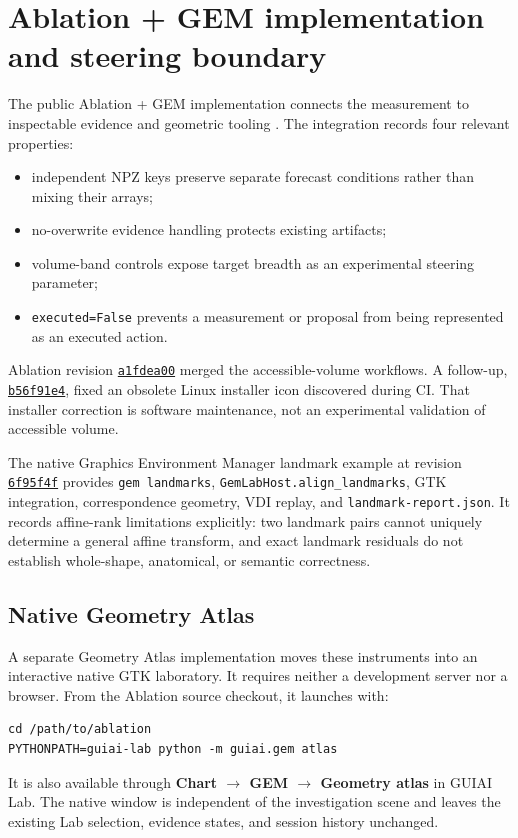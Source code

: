 \documentclass[11pt,a4paper]{article}
\begin{document}
\section{Ablation + GEM implementation and steering boundary}
The public Ablation + GEM implementation connects the measurement to inspectable evidence and geometric tooling \cite{ablationintegration,gemlandmarks}. The integration records four relevant properties:
\begin{itemize}[nosep]
  \item independent NPZ keys preserve separate forecast conditions rather than mixing their arrays;
  \item no-overwrite evidence handling protects existing artifacts;
  \item volume-band controls expose target breadth as an experimental steering parameter;
  \item \texttt{executed=False} prevents a measurement or proposal from being represented as an executed action.
\end{itemize}
Ablation revision \href{https://github.com/Ablation-Tool/ablation/commit/a1fdea008d2ae2969e0eafd7fa7d8abe9a9b37b9}{\texttt{a1fdea00}} merged the accessible-volume workflows. A follow-up, \href{https://github.com/Ablation-Tool/ablation/commit/b56f91e4c54cfd996bceea63a38d8136dc1e689f}{\texttt{b56f91e4}}, fixed an obsolete Linux installer icon discovered during CI. That installer correction is software maintenance, not an experimental validation of accessible volume.

The native Graphics Environment Manager landmark example at revision \href{https://github.com/Ablation-Tool/graphics-environment-manager/commit/6f95f4f}{\texttt{6f95f4f}} provides \texttt{gem landmarks}, \texttt{GemLabHost.align\_landmarks}, GTK integration, correspondence geometry, VDI replay, and \texttt{landmark-report.json}. It records affine-rank limitations explicitly: two landmark pairs cannot uniquely determine a general affine transform, and exact landmark residuals do not establish whole-shape, anatomical, or semantic correctness.

\subsection{Native Geometry Atlas}
A separate Geometry Atlas implementation moves these instruments into an interactive native GTK laboratory. It requires neither a development server nor a browser. From the Ablation source checkout, it launches with:
\begin{lstlisting}
cd /path/to/ablation
PYTHONPATH=guiai-lab python -m guiai.gem atlas
\end{lstlisting}
It is also available through \textbf{Chart $\rightarrow$ GEM $\rightarrow$ Geometry atlas} in GUIAI Lab. The native window is independent of the investigation scene and leaves the existing Lab selection, evidence states, and session history unchanged.
\end{document}
